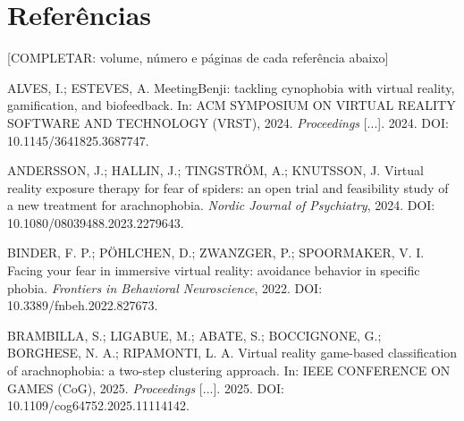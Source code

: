 \newpage
\section*{Referências}

\begingroup
\singlespacing
\setlength{\parindent}{0pt}
\setlength{\parskip}{0.7\baselineskip}
\raggedright

%
%
%
%

[COMPLETAR: volume, número e páginas de cada referência abaixo]

ALVES, I.; ESTEVES, A. MeetingBenji: tackling cynophobia with virtual
reality, gamification, and biofeedback. In: ACM SYMPOSIUM ON VIRTUAL
REALITY SOFTWARE AND TECHNOLOGY (VRST), 2024. \textit{Proceedings}
[...]. 2024. DOI: 10.1145/3641825.3687747.

ANDERSSON, J.; HALLIN, J.; TINGSTRÖM, A.; KNUTSSON, J. Virtual reality
exposure therapy for fear of spiders: an open trial and feasibility
study of a new treatment for arachnophobia. \textit{Nordic Journal of
Psychiatry}, 2024. DOI: 10.1080/08039488.2023.2279643.

BINDER, F. P.; PÖHLCHEN, D.; ZWANZGER, P.; SPOORMAKER, V. I. Facing your
fear in immersive virtual reality: avoidance behavior in specific
phobia. \textit{Frontiers in Behavioral Neuroscience}, 2022.
DOI: 10.3389/fnbeh.2022.827673.

BRAMBILLA, S.; LIGABUE, M.; ABATE, S.; BOCCIGNONE, G.; BORGHESE, N. A.;
RIPAMONTI, L. A. Virtual reality game-based classification of
arachnophobia: a two-step clustering approach. In: IEEE CONFERENCE ON
GAMES (CoG), 2025. \textit{Proceedings} [...]. 2025.
DOI: 10.1109/cog64752.2025.11114142.

